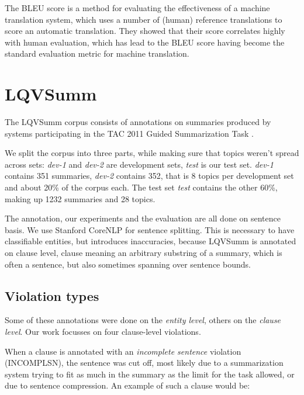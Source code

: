 \documentclass[a4paper,10pt]{scrartcl}
\theoremstyle{style}
\begin{document}
The BLEU score \citep{papineni2002bleu} is a method for evaluating the effectiveness of a machine translation system, which uses a number of (human) reference translations to score an automatic translation. They showed that their score correlates highly with human evaluation, which has lead to the BLEU score having become the standard evaluation metric for machine translation.

\section{LQVSumm}
\label{corpus_study}
The LQVSumm corpus consists of annotations on summaries produced by systems participating in the TAC 2011 Guided Summarization Task \citep{owczarzak2011overview}.

We split the corpus into three parts, while making sure that topics weren't spread across sets: \textit{dev-1} and \textit{dev-2} are development sets, \textit{test} is our test set.
\textit{dev-1} contains 351 summaries, \textit{dev-2} contains 352, that is 8 topics per development set and about 20\% of the corpus each.
The test set \textit{test} contains the other 60\%, making up 1232 summaries and 28 topics.

The annotation, our experiments and the evaluation are all done on sentence basis. We use Stanford CoreNLP \citep{manning-EtAl:2014:P14-5} for sentence splitting. This is necessary to have classifiable entities, but introduces inaccuracies, because LQVSumm is annotated on clause level, clause meaning an arbitrary substring of a summary, which is often a sentence, but also sometimes spanning over sentence bounds.

\subsection{Violation types}

Some of these annotations were done on the \textit{entity level}, others on the \textit{clause level}. Our work focusses on four clause-level violations.

When a clause is annotated with an \textit{incomplete sentence} violation (INCOMPLSN), the sentence was cut off, most likely due to a summarization system trying to fit as much in the summary as the limit for the task allowed, or due to sentence compression. An example of such a clause would be:
\end{document}
